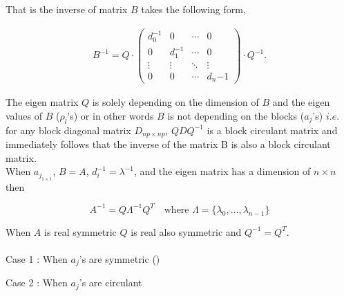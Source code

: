 That is the inverse of matrix $B$ takes the following form,

\begin{eqnarray*}
	B^{-1} = Q\cdot\left(
		\begin{array}{llll}
			d_0^{-1}  & 0              & \cdots & 0 \\
			0         & d_1^{-1}       & \cdots & 0 \\
			\vdots    & \vdots         & \ddots & \vdots  \\
			0         & 0              & \cdots & d_n{-1}     
		\end{array}
	\right)\cdot Q^{-1}.
\end{eqnarray*}

The eigen matrix $Q$ is solely depending on the dimension of $B$ and the eigen values of $B$ ($\rho_l$'s) or in other words $B$ is not depending on the blocks ($a_j$'s) $i.e.$ for any block diagonal matrix $D_{np \times np}$, $QDQ^{-1}$ is a block circulant matrix and immediately follows that the inverse of the matrix B is also a block circulant matrix.\\

When $a_{j_{1\times 1}}$, $B=A$, $d_i^{-1}=\lambda^{-1}$, and the eigen matrix has a dimension of $n\times n$ then

\[
A^{-1} = Q \Lambda^{-1} Q^T \quad \mbox{where $\Lambda = \{\lambda_0, \ldots, \lambda_{n-1} \}$}
\]


When $A$ is real symmetric $Q$ is real also symmetric and $Q^{-1}=Q^T$.\\


\\

Case 1 : When $a_j$'s are symmetric ()

Case 2 : When $a_j$'s are circulant





%
%
